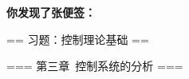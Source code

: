 \newcommand{\A}{\boldsymbol{A}}
\newcommand{\B}{\boldsymbol{B}}
\newcommand{\C}{\boldsymbol{C}}
\newcommand{\I}{\boldsymbol{I}}
\newcommand{\x}{\boldsymbol{x}}
\newcommand{\K}{\boldsymbol{K}}
\newcommand{\0}{\boldsymbol{0}}
\newcommand{\t}{\text{T}}
\theoremstyle{plain}\newtheorem*{problem}{Problem}
\theoremstyle{plain}\newtheorem*{UT}{Uniqueness Theorem}
\theoremstyle{remark}\newtheorem*{comment}{控制论大厦}

\textbf{你发现了张便签：}

== 习题：控制理论基础 ==

=== 第三章\ 控制系统的分析 ===

